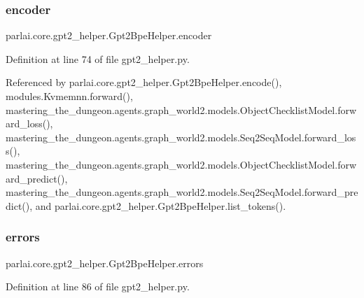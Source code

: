 \mbox{\label{classparlai_1_1core_1_1gpt2__helper_1_1Gpt2BpeHelper_a794ff2b9372acac9ab7c80b5c07ab60b}} 
\subsubsection{\texorpdfstring{encoder}{encoder}}
{\footnotesize\ttfamily parlai.\+core.\+gpt2\+\_\+helper.\+Gpt2\+Bpe\+Helper.\+encoder}



Definition at line 74 of file gpt2\+\_\+helper.\+py.



Referenced by parlai.\+core.\+gpt2\+\_\+helper.\+Gpt2\+Bpe\+Helper.\+encode(), modules.\+Kvmemnn.\+forward(), mastering\+\_\+the\+\_\+dungeon.\+agents.\+graph\+\_\+world2.\+models.\+Object\+Checklist\+Model.\+forward\+\_\+loss(), mastering\+\_\+the\+\_\+dungeon.\+agents.\+graph\+\_\+world2.\+models.\+Seq2\+Seq\+Model.\+forward\+\_\+loss(), mastering\+\_\+the\+\_\+dungeon.\+agents.\+graph\+\_\+world2.\+models.\+Object\+Checklist\+Model.\+forward\+\_\+predict(), mastering\+\_\+the\+\_\+dungeon.\+agents.\+graph\+\_\+world2.\+models.\+Seq2\+Seq\+Model.\+forward\+\_\+predict(), and parlai.\+core.\+gpt2\+\_\+helper.\+Gpt2\+Bpe\+Helper.\+list\+\_\+tokens().

\mbox{\label{classparlai_1_1core_1_1gpt2__helper_1_1Gpt2BpeHelper_a0ea9f7588f25a62eb6021a54ea8ca095}} 
\subsubsection{\texorpdfstring{errors}{errors}}
{\footnotesize\ttfamily parlai.\+core.\+gpt2\+\_\+helper.\+Gpt2\+Bpe\+Helper.\+errors}



Definition at line 86 of file gpt2\+\_\+helper.\+py.



